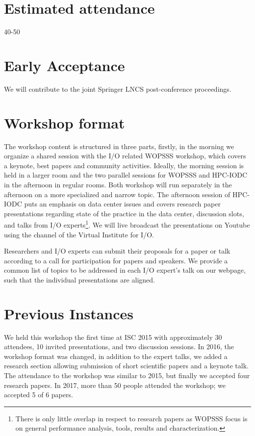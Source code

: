 \documentclass[a4paper,10pt]{article}
\begin{document}
\section{Estimated attendance}
40-50

\section{Early Acceptance}

We will contribute to the joint Springer LNCS post-conference proceedings.


\section{Workshop format}
The workshop content is structured in three parts, firstly, in the morning we organize a shared session with the I/O related WOPSSS workshop, which covers a keynote, best papers and community activities.
Ideally, the morning session is held in a larger room and the two parallel sessions for WOPSSS and HPC-IODC in the afternoon in regular rooms.
Both workshop will run separately in the afternoon on a more specialized and narrow topic.
The afternoon session of HPC-IODC puts an emphasis on data center issues and covers research paper presentations regarding state of the practice in the data center, discussion slots, and talks from I/O experts\footnote{
There is only little overlap in respect to research papers as WOPSSS focus is on general performance analysis, tools, results and characterization.}.
We will live broadcast the presentations on Youtube using the channel of the  Virtual Institute for I/O.

Researchers and I/O experts can submit their proposals for a paper or talk according to a call for participation for papers and speakers.
We provide a common list of topics to be addressed in each I/O expert's talk on our  webpage, such that the individual presentations are aligned.



\section{Previous Instances}
We held this workshop the first time at ISC 2015 with approximately 30 attendees, 10 invited presentations, and two discussion sessions.
In 2016, the workshop format was changed, in addition to the expert talks, we added a research section allowing submission of short scientific papers and a keynote talk.
The attendance to the workshop was similar to 2015, but finally we accepted four research papers.
In 2017, more than 50 people attended the workshop; we accepted 5 of 6 papers.
\end{document}
